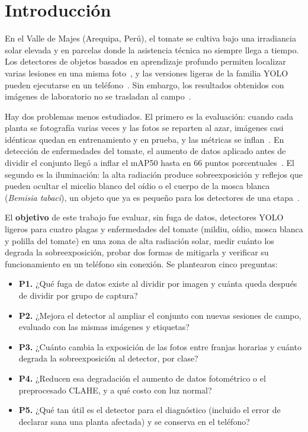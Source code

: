 \documentclass[sensors,article,submit,pdftex,moreauthors]{Definitions/mdpi}
\begin{document}
\section{Introducción}

{\color{blue} En el Valle de Majes (Arequipa, Perú), el tomate se cultiva bajo una irradiancia solar elevada y en parcelas donde la asistencia técnica no siempre llega a tiempo.} {\color{blue} Los detectores de objetos basados en aprendizaje profundo permiten localizar varias lesiones en una misma foto~\cite{Fuentes2017}, y las versiones ligeras de la familia YOLO pueden ejecutarse en un teléfono~\cite{Zhong2024,Wang2025}.} {\color{blue} Sin embargo, los resultados obtenidos con imágenes de laboratorio no se trasladan al campo~\cite{Mohanty2016,Jelali2024}.}

{\color{blue} Hay dos problemas menos estudiados.} {\color{blue} El primero es la evaluación: cuando cada planta se fotografía varias veces y las fotos se reparten al azar, imágenes casi idénticas quedan en entrenamiento y en prueba, y las métricas se inflan~\cite{Kapoor2023}.} {\color{blue} En detección de enfermedades del tomate, el aumento de datos aplicado antes de dividir el conjunto llegó a inflar el mAP50 hasta en 66 puntos porcentuales~\cite{Gerz2025}.} {\color{blue} El segundo es la iluminación: la alta radiación produce sobreexposición y reflejos que pueden ocultar el micelio blanco del oídio o el cuerpo de la mosca blanca (\emph{Bemisia tabaci}), un objeto que ya es pequeño para los detectores de una etapa~\cite{Zhang2024Jute,Zhao2025}.}

{\color{blue} El \textbf{objetivo} de este trabajo fue evaluar, sin fuga de datos, detectores YOLO ligeros para cuatro plagas y enfermedades del tomate (mildiu, oídio, mosca blanca y polilla del tomate) en una zona de alta radiación solar, medir cuánto los degrada la sobreexposición, probar dos formas de mitigarla y verificar su funcionamiento en un teléfono sin conexión.} {\color{blue} Se plantearon cinco preguntas:}
{\color{blue}
\begin{itemize}[leftmargin=*,labelsep=4.9mm]
\item \textbf{P1.} ¿Qué fuga de datos existe al dividir por imagen y cuánta queda después de dividir por grupo de captura?
\item \textbf{P2.} ¿Mejora el detector al ampliar el conjunto con nuevas sesiones de campo, evaluado con las mismas imágenes y etiquetas?
\item \textbf{P3.} ¿Cuánto cambia la exposición de las fotos entre franjas horarias y cuánto degrada la sobreexposición al detector, por clase?
\item \textbf{P4.} ¿Reducen esa degradación el aumento de datos fotométrico o el preprocesado CLAHE, y a qué costo con luz normal?
\item \textbf{P5.} ¿Qué tan útil es el detector para el diagnóstico (incluido el error de declarar sana una planta afectada) y se conserva en el teléfono?
\end{itemize}
}
\end{document}
